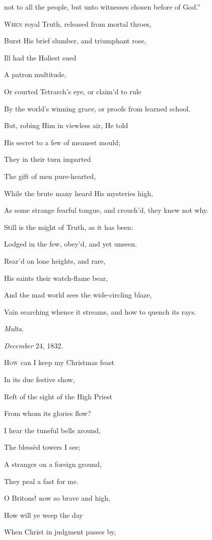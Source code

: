 not to all the people, but unto witnesses chosen before of God.''

W\textsc{hen} royal Truth, released from mortal throes,

Burst His brief slumber, and triumphant rose,

Ill had the Holiest sued

A patron multitude,

Or courted Tetrarch's eye, or claim'd to
rule

By the world's winning grace, or proofs from learned school.

But, robing Him in viewless air, He told

His secret to a few of meanest mould;

They in their turn imparted

The gift of men pure-hearted,

While the brute many heard His mysteries
high,

As some strange fearful tongue, and crouch'd, they knew not
why.

Still is the might of Truth, as it has been:

Lodged in the few, obey'd, and yet unseen.

Rear'd on lone heights, and rare,

His saints their watch-flame bear,

And the mad world sees the wide-circling
blaze,

Vain searching whence it streams, and how to quench its rays.

\emph{Malta}.

\emph{December} 24, 1832.


H\textsc{ow} can I keep my Christmas feast

In its due festive show,

Reft of the sight of the High Priest

From whom its glories flow?

I hear the tuneful bells around,

The blessèd towers I see;

A stranger on a foreign ground,

They peal a fast for me.

O Britons! now so brave and high,

How will ye weep the day

When Christ in judgment passes by,

